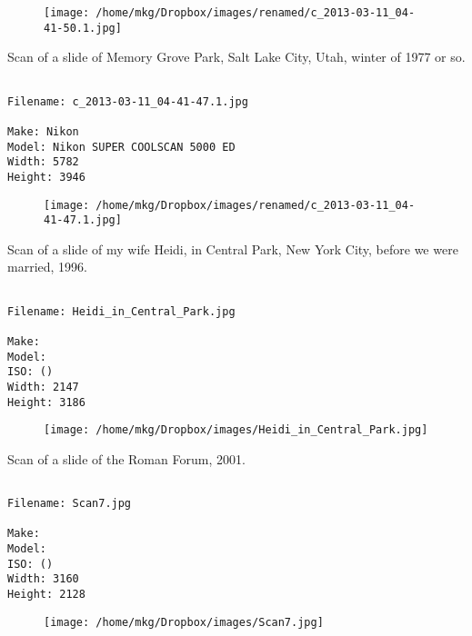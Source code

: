 \begin{figure}
\texttt{[image: /home/mkg/Dropbox/images/renamed/c\_2013-03-11\_04-41-50.1.jpg]}
\end{figure}
    
\clearpage
\onecolumn
\noindent Scan of a slide of Memory Grove Park, Salt Lake City, Utah, winter of 1977 or so.
\noindent
\begin{lstlisting}

Filename: c_2013-03-11_04-41-47.1.jpg

Make: Nikon
Model: Nikon SUPER COOLSCAN 5000 ED
Width: 5782
Height: 3946
\end{lstlisting}
\clearpage

\begin{figure}
\texttt{[image: /home/mkg/Dropbox/images/renamed/c\_2013-03-11\_04-41-47.1.jpg]}
\end{figure}
    
\clearpage
\onecolumn
\noindent Scan of a slide of my wife Heidi, in Central Park, New York City, before we were married, 1996.
\noindent
\begin{lstlisting}

Filename: Heidi_in_Central_Park.jpg

Make: 
Model: 
ISO: ()
Width: 2147
Height: 3186
\end{lstlisting}
\clearpage

\begin{figure}
\texttt{[image: /home/mkg/Dropbox/images/Heidi\_in\_Central\_Park.jpg]}
\end{figure}
    
\clearpage
\onecolumn
\noindent Scan of a slide of the Roman Forum, 2001.
\noindent
\begin{lstlisting}

Filename: Scan7.jpg

Make: 
Model: 
ISO: ()
Width: 3160
Height: 2128
\end{lstlisting}
\clearpage

\begin{figure}
\texttt{[image: /home/mkg/Dropbox/images/Scan7.jpg]}
\end{figure}
    
